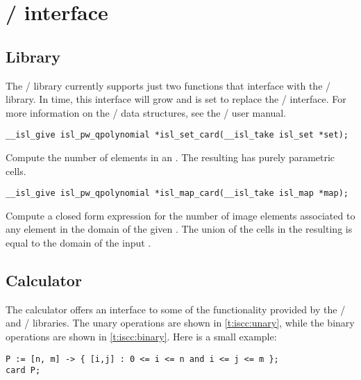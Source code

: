 \section{\protect\isl/ interface}

\subsection{Library}

The \barvinok/ library currently supports just two
functions that interface with the \isl/ library.
In time, this interface will grow and is set to replace
the \PolyLib/ interface.
For more information on the \isl/ data structures, see
the \isl/ user manual.

\begin{verbatim}
__isl_give isl_pw_qpolynomial *isl_set_card(__isl_take isl_set *set);
\end{verbatim}
Compute the number of elements in an .
The resulting  has purely parametric cells.

\begin{verbatim}
__isl_give isl_pw_qpolynomial *isl_map_card(__isl_take isl_map *map);
\end{verbatim}
Compute a closed form expression for the number of image elements
associated to any element in the domain of the given .
The union of the cells in the resulting 
is equal to the domain of the input .

\subsection{Calculator}

The  calculator offers an interface to some
of the functionality provided by the \isl/ and \barvinok/
libraries.
The unary operations are shown in \autoref{t:iscc:unary},
while the binary operations are shown in \autoref{t:iscc:binary}.
Here is a small example:
\begin{verbatim}
P := [n, m] -> { [i,j] : 0 <= i <= n and i <= j <= m };
card P;
\end{verbatim}

